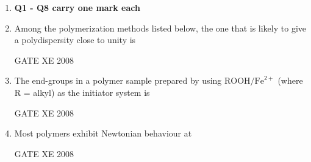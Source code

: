 \documentclass[12pt]{article}
\begin{document}
\begin{enumerate}[label=Q\arabic*.]
\item[] \textbf{Q1 - Q8 carry one mark each}

\item Among the polymerization methods listed below, the one that is likely to give a polydispersity close to unity is  

\begin{enumerate}[label=(\Alph*)]
\end{enumerate}

 GATE XE 2008

\item The end-groups in a polymer sample prepared by using $\mathrm{ROOH}/\mathrm{Fe}^{2+}$ (where R = alkyl) as the initiator system is  

\begin{enumerate}[label=(\Alph*)]
\end{enumerate}

 GATE XE 2008

\item Most polymers exhibit Newtonian behaviour at  

\begin{enumerate}[label=(\Alph*)]
\end{enumerate}

GATE XE 2008


\end{enumerate}
\end{document}
